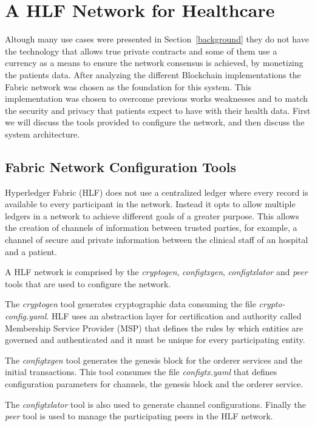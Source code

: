 \chapter{A HLF Network for Healthcare} \label{HLFHealthcare} Altough many use
cases were presented in Section~\ref{background} they do not have the
technology that allows true private contracts and some of them use a currency
as a means to ensure the network consensus is achieved, by monetizing the
patients data.  After analyzing the different Blockchain implementations the
Fabric network was chosen as the foundation for this system. This
implementation was chosen to overcome previous works weaknesses and to match
the security and privacy that patients expect to have with their health data.
First we will discuss the tools provided to configure the network, and then
discuss the system architecture.

\section{Fabric Network Configuration Tools}

Hyperledger Fabric (HLF) does not use a centralized ledger where every record
is available to every participant in the network.  Instead it opts to allow
multiple ledgers in a network to achieve different goals of a greater purpose.
This allows the creation of channels of information between trusted parties,
for example, a channel of secure and private information between the clinical
staff of an hospital and a patient.

A HLF network is comprised by the \textit{cryptogen}, \textit{configtxgen},
\textit{configtxlator} and \textit{peer} tools that are used to configure the
network.

The \textit{cryptogen} tool generates cryptographic data consuming the file
\textit{crypto-config.yaml}.  HLF uses an abstraction layer for certification
and authority called Membership Service Provider (MSP) that defines the rules
by which entities are governed and authenticated and it must be unique for
every participating entity.

The \textit{configtxgen} tool generates the genesis block for the orderer
services and the initial transactions.  This tool consumes the file
\textit{configtx.yaml} that defines configuration parameters for channels, the
genesis block and the orderer service.

The \textit{configtxlator} tool is also used to generate channel configurations. 
Finally the \textit{peer} tool is used to manage the participating peers in the HLF network.

